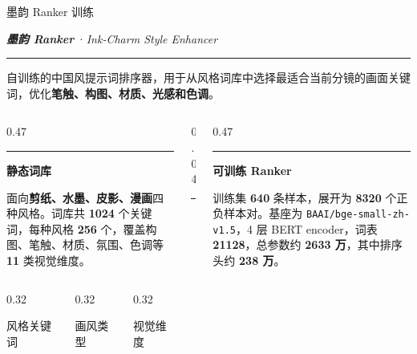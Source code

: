 \documentclass{beamer}
\newcommand{\kw}[1]{\textcolor{importantred}{\textbf{#1}}}
\newcommand{\goldrule}{\par\vspace{3pt}\noindent\textcolor{accentgold!60}{\rule{\linewidth}{0.4pt}}\par\vspace{3pt}}
\newcommand{\bignum}[1]{{\fontsize{15}{17}\selectfont\bfseries\color{buptred}#1}}
\newcommand{\bignumG}[1]{{\fontsize{15}{17}\selectfont\bfseries\color{accentgold}#1}}
\newcommand{\sidehead}[2][buptred]{%
  {\color{#1}\rule[-0.15em]{2.5pt}{1.0em}}\hspace{0.45em}\textbf{\small\color{darkred}#2}\par
  \vspace{2pt}%
}
\newcommand{\heroLG}[1]{%
  {\centering\color{darkred}\itshape\normalsize #1\par}%
}
\begin{document}
\begin{frame}[t]{墨韵 Ranker 训练}
    \vspace{-0.04cm}
    \heroLG{\textbf{墨韵 Ranker}\,·\,Ink-Charm Style Enhancer}
    \goldrule
    \vspace{0.05cm}

    \footnotesize
    自训练的中国风提示词排序器，用于从风格词库中选择最适合当前分镜的画面关键词，优化\textbf{笔触、构图、材质、光感和色调}。

    \vspace{0.38cm}
    \begin{columns}[T, onlytextwidth]
        \begin{column}[T]{0.47\linewidth}
            \sidehead{静态词库}
            \scriptsize
            面向\kw{剪纸、水墨、皮影、漫画}四种风格。词库共 \kw{1024} 个关键词，每种风格 \kw{256} 个，覆盖构图、笔触、材质、氛围、色调等 \kw{11} 类视觉维度。

            \vspace{0.28cm}
            \begin{columns}[T, onlytextwidth]
                \begin{column}[T]{0.32\linewidth}
                    \centering\bignum{1024}\par
                    \tiny 风格关键词
                \end{column}
                \begin{column}[T]{0.32\linewidth}
                    \centering\bignumG{4}\par
                    \tiny 画风类型
                \end{column}
                \begin{column}[T]{0.32\linewidth}
                    \centering\bignum{11}\par
                    \tiny 视觉维度
                \end{column}
            \end{columns}
        \end{column}
        \begin{column}[T]{0.04\linewidth}
            \centering\textcolor{accentgold!60}{\rule{0.4pt}{8.4em}}
        \end{column}
        \begin{column}[T]{0.47\linewidth}
            \sidehead[accentgold]{可训练 Ranker}
            \scriptsize
            训练集 \kw{640} 条样本，展开为 \kw{8320} 个正负样本对。基座为 \texttt{BAAI/bge-small-zh-v1.5}，4 层 BERT encoder，词表 \kw{21128}，总参数约 \kw{2633 万}，其中排序头约 \kw{238 万}。


\end{column}
\end{columns}
\end{frame}
\end{document}
